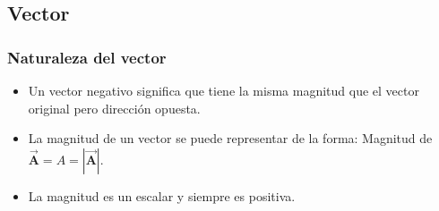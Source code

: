 \documentclass[
    aspectratio=169, %
    ]{beamer}
\newcommand{\vc}[1]{\vec{\bm{{#1}}}}
\begin{document}
\subsection{Vector}
\begin{frame}
	\frametitle{Naturaleza del vector}\pause
	\begin{itemize}
        \item Un vector negativo significa que tiene la misma magnitud que el vector original pero dirección opuesta.\pause
        \begin{center}
            
        \end{center}\pause
        \item La magnitud de un vector se puede representar de la forma: Magnitud de $\vc{A} = A = |\vc{A}|$.\pause
        \item La magnitud es un escalar y siempre es positiva.
    \end{itemize}
\end{frame}
\end{document}
